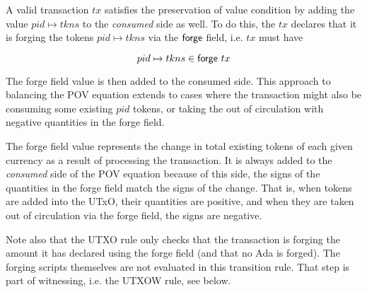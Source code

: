 A valid transaction $tx$ satisfies the preservation of value
condition by adding the value $pid \mapsto tkns$ to the \textit{consumed} side as well.
To do this, the $tx$ declares that it is forging the tokens $pid \mapsto tkns$
via the $\mathsf{forge}$ field, i.e. $tx$ must have

\[pid \mapsto tkns\in\mathsf{forge}~tx\]

The forge field value is then added to the consumed side. This approach
to balancing the POV equation extends
to cases where the transaction might also be consuming some existing $pid$ tokens,
or taking the out of circulation with negative quantities in the forge field.

The forge field value represents the change in total existing tokens of each given currency
as a result of processing the transaction. It is always added to the
\textit{consumed} side of the POV equation because of this side, the signs of the
quantities in the forge field match the signs of the change. That is,
when tokens are added into the UTxO, their quantities are positive, and when they are
taken out of circulation via the forge field, the signs are negative.

Note also that the UTXO rule only checks that the transaction is forging the
amount it has declared using the forge field (and that no Ada is forged).
The forging scripts themselves are not evaluated in this transition rule.
That step is part of witnessing, i.e. the UTXOW rule, see below.

